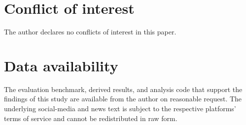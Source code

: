 \documentclass[12pt,a4paper]{article}
\begin{document}
\section*{Conflict of interest}
The author declares no conflicts of interest in this paper.

\section*{Data availability}
The evaluation benchmark, derived results, and analysis code that support the
findings of this study are available from the author on reasonable request. The
underlying social-media and news text is subject to the respective platforms' terms
of service and cannot be redistributed in raw form.

\end{document}
